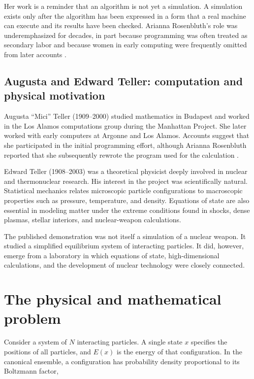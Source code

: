 \documentclass[11pt]{article}
\begin{document}
Her work is a reminder that an algorithm is not yet a simulation. A simulation
exists only after the algorithm has been expressed in a form that a real machine
can execute and its results have been checked. Arianna Rosenbluth's role was
underemphasized for decades, in part because programming was often treated as
secondary labor and because women in early computing were frequently omitted
from later accounts \cite{apsrosenbluth}.

\subsection{Augusta and Edward Teller: computation and physical motivation}

Augusta ``Mici'' Teller (1909--2000) studied mathematics in Budapest and worked
in the Los Alamos computations group during the Manhattan Project. She later
worked with early computers at Argonne and Los Alamos. Accounts suggest that
she participated in the initial programming effort, although Arianna Rosenbluth
reported that she subsequently rewrote the program used for the calculation
\cite{gubernatis2005,micibio}.

Edward Teller (1908--2003) was a theoretical physicist deeply involved in
nuclear and thermonuclear research. His interest in the project was scientifically
natural. Statistical mechanics relates microscopic particle configurations to
macroscopic properties such as pressure, temperature, and density. Equations of
state are also essential in modeling matter under the extreme conditions found
in shocks, dense plasmas, stellar interiors, and nuclear-weapon calculations.

The published demonstration was not itself a simulation of a nuclear weapon.
It studied a simplified equilibrium system of interacting particles. It did,
however, emerge from a laboratory in which equations of state, high-dimensional
calculations, and the development of nuclear technology were closely connected.

\section{The physical and mathematical problem}

Consider a system of $N$ interacting particles. A single state $x$ specifies
the positions of all particles, and $E(x)$ is the energy of that configuration.
In the canonical ensemble, a configuration has probability density proportional
to its Boltzmann factor,
\end{document}
